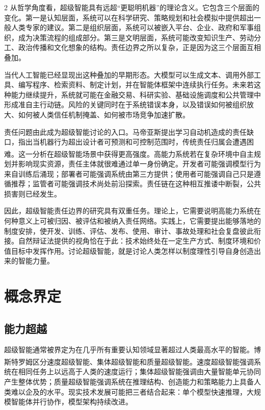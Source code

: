 \documentclass[a4paper,UTF8,zihao=5,twoside]{ctexart}
\newcommand{\upcite}[1]{\textsuperscript{\cite{#1}}}
\begin{document}
\begin{multicols}{2}
从哲学角度看，超级智能具有远超“更聪明机器”的理论含义。它包含三个层面的变化。第一是认知层面，系统可以在科学研究、策略规划和社会模拟中提供超出一般人类专家的建议。第二是组织层面，系统可以被嵌入平台、企业、政府和军事组织，成为决策流程的组成部分。第三是文明层面，系统可能改变知识生产、劳动分工、政治传播和文化想象的结构。责任边界之所以复杂，正是因为这三个层面互相叠加。

当代人工智能已经显现出这种叠加的早期形态。大模型可以生成文本、调用外部工具、编写程序、检索资料、制定计划，并在智能体框架中连续执行任务。未来若这种能力继续提升，系统就可能在金融交易、科研实验、基础设施调度和公共管理中形成准自主行动链。风险的关键同时在于系统错误本身，以及错误如何被组织放大、如何被人类信任机制掩盖、如何被市场竞争加速扩散。

责任问题由此成为超级智能讨论的入口。马帝亚斯提出学习自动机造成的责任缺口，指出当机器行为超出设计者可预测和可控制范围时，传统责任归属会遭遇困难\upcite{matthias2004}。这一分析在超级智能场景中获得更高强度。高能力系统若在复杂环境中自主规划并影响现实资源，责任主体就很难通过单一身份确定。开发者可能强调模型行为来自训练后涌现；部署者可能强调系统由第三方提供；使用者可能强调自己只是遵循推荐；监管者可能强调技术尚处前沿探索。责任链在这种相互推诿中断裂，公共损害则已经发生。

因此，超级智能责任边界的研究具有双重任务。理论上，它需要说明高能力系统在何种意义上可被归因、被评估和被纳入责任网络。实践上，它需要提出能够落地的制度安排，使开发、训练、评估、发布、使用、审计、事故处理和社会复盘彼此衔接。自然辩证法提供的视角恰在于此：技术始终处在一定生产方式、制度环境和价值目标中发挥作用。讨论超级智能，就是讨论人类怎样以制度理性引导自身创造出来的智能力量。

\section{概念界定}

\subsection{能力超越}

超级智能通常被界定为在几乎所有重要认知领域显著超过人类最高水平的智能。博斯特罗姆区分速度超级智能、集体超级智能和质量超级智能\upcite{bostrom2014}。速度超级智能强调系统在相同任务上以远高于人类的速度运行；集体超级智能强调由大量智能单元协同产生整体优势；质量超级智能强调系统在推理结构、创造能力和策略能力上具备人类难以企及的水平。现实技术发展可能把三者结合起来：单个模型快速推理，大规模智能体并行协作，模型架构持续改进。


\end{multicols}
\end{document}
